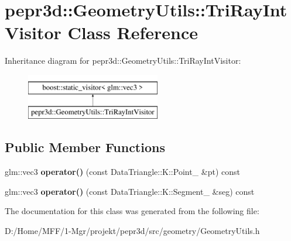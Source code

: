 \hypertarget{classpepr3d_1_1_geometry_utils_1_1_tri_ray_int_visitor}{}\section{pepr3d\+::Geometry\+Utils\+::Tri\+Ray\+Int\+Visitor Class Reference}
\label{classpepr3d_1_1_geometry_utils_1_1_tri_ray_int_visitor}
Inheritance diagram for pepr3d\+::Geometry\+Utils\+::Tri\+Ray\+Int\+Visitor\+:\begin{figure}[H]
\begin{center}
\leavevmode
\includegraphics[height=2.000000cm]{classpepr3d_1_1_geometry_utils_1_1_tri_ray_int_visitor}
\end{center}
\end{figure}
\subsection*{Public Member Functions}
\begin{DoxyCompactItemize}
\item 
\mbox{\label{classpepr3d_1_1_geometry_utils_1_1_tri_ray_int_visitor_aa41e00b96431719fc280b16f03f69e50}} 
glm\+::vec3 {\bfseries operator()} (const Data\+Triangle\+::\+K\+::\+Point\+\_ \&pt) const
\item 
\mbox{\label{classpepr3d_1_1_geometry_utils_1_1_tri_ray_int_visitor_a3927bf8cc4cbc442ebbe2810a767c5fd}} 
glm\+::vec3 {\bfseries operator()} (const Data\+Triangle\+::\+K\+::\+Segment\+\_ \&seg) const
\end{DoxyCompactItemize}


The documentation for this class was generated from the following file\+:\begin{DoxyCompactItemize}
\item 
D\+:/\+Home/\+M\+F\+F/1-\/\+Mgr/projekt/pepr3d/src/geometry/Geometry\+Utils.\+h\end{DoxyCompactItemize}
